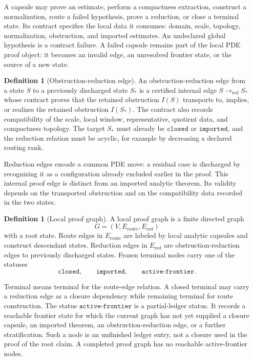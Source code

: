 \documentclass[11pt]{article}
\theoremstyle{plain}
\theoremstyle{definition}
\newtheorem{definition}[theorem]{Definition}
\theoremstyle{remark}
\begin{document}
A capsule may prove an estimate, perform a compactness extraction, construct a
normalization, route a failed hypothesis, prove a reduction, or close a
terminal state.  Its contract specifies the local data it consumes: domain,
scale, topology, normalization, obstruction, and imported estimates.  An
undeclared global hypothesis is a contract failure.  A failed capsule remains
part of the local PDE proof object: it becomes an invalid edge, an unresolved
frontier state, or the source of a new state.

\begin{definition}[Obstruction-reduction edge]
An obstruction-reduction edge from a state \(S\) to a previously discharged
state \(S_*\) is a certified internal edge \(S\to_{\mathrm{red}} S_*\) whose contract proves
that the retained obstruction \(I(S)\) transports to, implies, or realizes the
retained obstruction \(I(S_*)\).  The contract also records compatibility of
the scale, local window, representative, quotient data, and
compactness topology.  The target \(S_*\) must already be
\(\texttt{closed}\) or \(\texttt{imported}\), and the reduction relation must
be acyclic, for example by decreasing a declared routing rank.
\end{definition}

Reduction edges encode a common PDE move: a residual case is discharged by
recognizing it as a configuration already excluded earlier in the proof.  This
internal proof edge is distinct from an imported analytic theorem.  Its
validity depends on the transported obstruction and on the compatibility data
recorded in the two states.

\begin{definition}[Local proof graph]
A local proof graph is a finite directed graph
\[
  G=(V,E_{\mathrm{route}},E_{\mathrm{red}})
\]
with a root state.  Route edges in \(E_{\mathrm{route}}\) are labeled by local
analytic capsules and construct descendant states.  Reduction edges in
\(E_{\mathrm{red}}\) are obstruction-reduction edges to previously discharged
states.  Frozen terminal nodes carry one of the statuses
\[
  \texttt{closed},\qquad \texttt{imported},\qquad
  \texttt{active-frontier}.
\]
\end{definition}

Terminal means terminal for the route-edge relation.  A closed terminal may
carry a reduction edge as a closure dependency while remaining terminal for
route construction.  The status \(\texttt{active-frontier}\) is a
partial-ledger status.
It records a reachable frontier state for which the current graph has not yet
supplied a closure capsule, an imported theorem, an obstruction-reduction edge,
or a further stratification.  Such a node is an unfinished ledger entry, not a
closure used in the proof of the root claim.  A completed proof graph has no
reachable active-frontier nodes.
\end{document}
